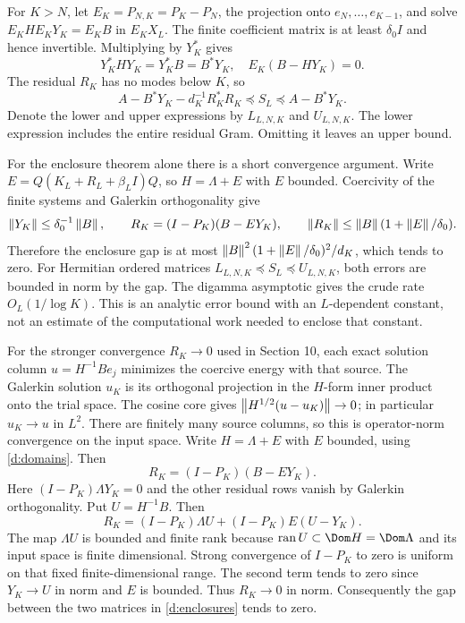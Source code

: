 For $K>N$, let $E_K=P_{N,K}=P_K-P_N$, the projection onto
$e_N,\ldots,e_{K-1}$, and solve $E_KHE_KY_K=E_KB$ in $E_KX_L$.
The finite coefficient matrix is at least $\delta_0I$ and hence invertible.
Multiplying by $Y_K^*$ gives
\[
Y_K^*HY_K=Y_K^*B=B^*Y_K,
\quad E_K(B-HY_K)=0.
\]
The residual $R_K$ has no modes below $K$, so
\begin{equation}\label{d:enclosures}
A-B^*Y_K-d_K^{-1}R_K^*R_K
\preceq S_L\preceq A-B^*Y_K.
\end{equation}
Denote the lower and upper expressions by $L_{L,N,K}$ and $U_{L,N,K}$.
The lower expression includes the entire residual Gram.
Omitting it leaves an upper bound.

For the enclosure theorem alone there is a short convergence argument.
Write $E=Q(K_L+R_L+\beta_LI)Q$, so $H=\Lambda+E$ with $E$ bounded.
Coercivity of the finite systems and Galerkin orthogonality give
\[
\left\lVert Y_K\right\rVert\le\delta_0^{-1}\left\lVert B\right\rVert,\qquad
R_K=(I-P_K)(B-EY_K),\qquad
\left\lVert R_K\right\rVert\le\left\lVert B\right\rVert(1+\left\lVert E\right\rVert/\delta_0).
\]
Therefore the enclosure gap is at most
$\left\lVert B\right\rVert^2(1+\left\lVert E\right\rVert/\delta_0)^2/d_K$, which tends to zero.
For Hermitian ordered matrices $L_{L,N,K}\preceq S_L\preceq U_{L,N,K}$,
both errors are bounded in norm by the gap.
The digamma asymptotic gives the crude rate $O_L(1/\log K)$.
This is an analytic error bound with an $L$-dependent constant, not an
estimate of the computational work needed to enclose that constant.

For the stronger convergence $R_K\to0$ used in Section 10, each exact solution column $u=H^{-1}Be_j$ minimizes
the coercive energy with that source. The Galerkin solution $u_K$ is its
orthogonal projection in the $H$-form inner product onto the trial space.
The cosine core gives $\left\lVert H^{1/2}(u-u_K)\right\rVert\to0$; in particular
$u_K\to u$ in $L^2$. There are finitely many source columns, so this is
operator-norm convergence on the input space.
Write $H=\Lambda+E$ with $E$ bounded, using \eqref{d:domains}. Then
\[
R_K=(I-P_K)(B-EY_K).
\]
Here $(I-P_K)\Lambda Y_K=0$ and the other residual rows vanish by
Galerkin orthogonality. Put $U=H^{-1}B$. Then
\[
R_K=(I-P_K)\Lambda U+(I-P_K)E(U-Y_K).
\]
The map $\Lambda U$ is bounded and finite rank because
$\operatorname{ran}U\subset\Dom H=\Dom\Lambda$ and its input space is
finite dimensional. Strong convergence of $I-P_K$ to zero is uniform on
that fixed finite-dimensional range. The second term tends to zero since
$Y_K\to U$ in norm and $E$ is bounded. Thus $R_K\to0$ in norm.
Consequently the gap
between the two matrices in \eqref{d:enclosures} tends to zero.

